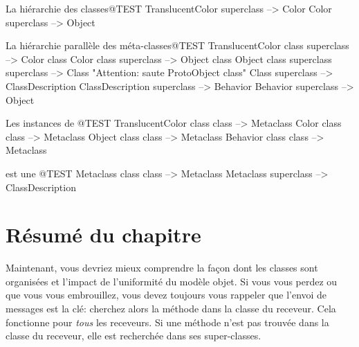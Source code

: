 \documentclass[a4paper,10pt,twoside]{book}
\begin{document}
\begin{example}{La hiérarchie des classes}{@TEST}
TranslucentColor superclass			--> Color
Color superclass			        --> Object
\end{example}

\begin{example}{La hi{é}rarchie parall{è}le des méta-classes}{@TEST}
TranslucentColor class superclass          --> Color class
Color class superclass                     --> Object class
Object class superclass superclass         --> Class    "Attention: saute ProtoObject class"
Class superclass                           --> ClassDescription
ClassDescription superclass                --> Behavior
Behavior superclass                        --> Object
\end{example}

\begin{example}{Les instances de }{@TEST}
TranslucentColor class class        --> Metaclass
Color class class                   --> Metaclass
Object class class                  --> Metaclass
Behavior class class                --> Metaclass
\end{example}

\begin{example}{ est une }{@TEST}
Metaclass class class --> Metaclass
Metaclass superclass --> ClassDescription
\end{example}

\section{Résumé du chapitre}

Maintenant, vous devriez mieux comprendre la façon dont les classes sont organisées et l'impact de l'uniformité du modèle objet.
Si vous vous perdez ou que vous vous embrouillez, vous devez toujours vous rappeler que l'envoi de messages est la clé: cherchez alors la méthode dans la classe du receveur.
Cela fonctionne pour \emph{tous} les receveurs.
Si une méthode n'est pas trouvée dans la classe du receveur, elle est recherchée dans ses super-classes.
\end{document}
